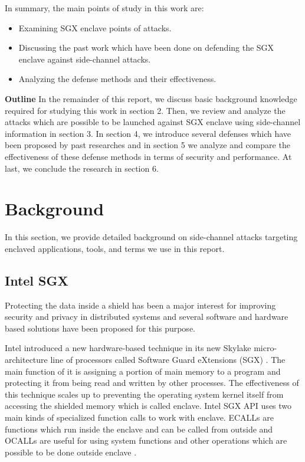 In summary, the main points of study in this work are:
\begin{itemize}
	\item Examining SGX enclave points of attacks.
	\item Discussing the past work which have been done on defending the SGX enclave against side-channel attacks.
	\item Analyzing the defense methods and their effectiveness.
\end{itemize} 
\textbf{Outline} In the remainder of this report, we discuss basic background knowledge required for studying this work in section 2. Then, we review and analyze the attacks which are possible to be launched against SGX enclave using side-channel information in section 3. In section 4, we introduce several defenses which have been proposed by past researches and in section 5 we analyze and compare the effectiveness of these defense methods in terms of security and performance. At last, we conclude the research in section 6.
\section{Background}
In this section, we provide detailed background on side-channel attacks targeting enclaved applications, tools, and terms we use in this report.

\subsection{Intel SGX}

Protecting the data inside a shield has been a major interest for improving security and privacy in distributed systems and several software and hardware based solutions have been proposed for this purpose.

Intel introduced a new hardware-based technique in its new Skylake micro-architecture \cite{skylake} line of processors called Software Guard eXtensions (SGX) \cite{sgx}. The main function of it is assigning a portion of main memory to a program and protecting it from being read and written by other processes. The effectiveness of this technique scales up to preventing the operating system kernel itself from accessing the shielded memory which is called enclave. Intel SGX API \cite{sgxapi} uses two main kinds of specialized function calls to work with enclave. ECALLs are functions which run inside the enclave and can be called from outside and OCALLs are useful for using system functions and other operations which are possible to be done outside enclave \cite{ecallocall}.

